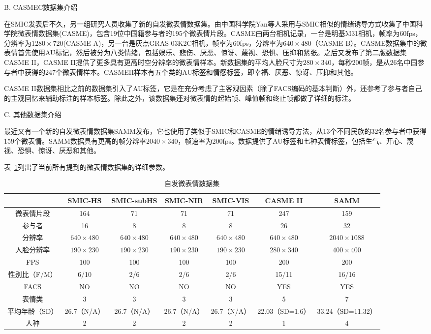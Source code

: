 B. CASMEC数据集介绍

在SMIC发表后不久，另一组研究人员收集了新的自发微表情数据集。由中国科学院Yan等人采用与SMIC相似的情绪诱导方式收集了中国科学院微表情数据集(CASME)，包含19位中国籍参与者的195个微表情片段。CASME由两台相机记录，一台是明基M31相机，帧率为60fps，分辨率为$1280\times720$(CASME-A)，另一台是灰点GRAS-03K2C相机，帧率为60fps，分辨率为$640\times480$（CASME-B）。CASME数据集中的微表情首先使用AU标记，然后被分为八类情绪，包括娱乐、悲伤、厌恶、惊讶、蔑视、恐惧、压抑和紧张。之后又发布了第二版数据集CASME II，CASME II提供了更多具有更高时空分辨率的微表情样本。新数据集的平均人脸尺寸为$280\times340$，每秒200帧，是从26名中国参与者中获得的247个微表情样本。CASMEII样本有五个类的AU标签和情感标签，即幸福、厌恶、惊讶、压抑和其他。

CASME II数据集相比之前的数据集引入了AU标签，它是在充分考虑了主客观因素（除了FACS编码的基本判断）外，还参考了参与者自己的主观回忆来辅助标注的样本标签。除此之外，该数据集还对微表情的起始帧、峰值帧和终止帧都做了详细的标注。

C. 其他数据集介绍

最近又有一个新的自发微表情数据集SAMM发布，它也使用了类似于SMIC和CASME的情绪诱导方法，从13个不同民族的32名参与者中获得159个微表情。SAMM数据具有更高的帧分辨率$2040\times340$，帧速率为200fps。数据提供了AU标签和七种表情标签，包括生气、开心、蔑视、恐惧、惊讶、厌恶和其他。

表~\ref{tab1}列出了当前所有提到的微表情数据集的详细参数。

\begin{table}[!htbp]
  \centering
  \caption{自发微表情数据集}
  \label{tab1}
  \footnotesize%
  \setlength{\tabcolsep}{4pt}%
  \renewcommand{\arraystretch}{1.2}%
  \begin{tabular}{c|cccccc}
    \hline
     & SMIC-HS & SMIC-subHS & SMIC-NIR & SMIC-VIS & CASME II & SAMM \\ \hline
    微表情片段 & 164 & 71 & 71 & 71 & 247 & 159 \\
    参与者 & 16 & 8 & 8 & 8 & 26 & 32 \\
    分辨率 & $640\times480$ & $640\times480$ & $640\times480$ & $640\times480$ & $640\times480$ & $2040\times1088$ \\
    人脸分辨率 & $190\times230$ & $190\times230$ & $190\times230$ & $190\times230$ & $280\times340$ & $400\times400$ \\
    FPS & 100 & 100 & 100 & 100 & 200 & 200 \\
    性别比（F/M） & 6/10 & 2/6 & 2/6 & 2/6 & 15/11 & 16/16 \\
    FACS & NO & NO & NO & NO & YES & YES \\
    表情类 & 3 & 3 & 3 & 3 & 5 & 7 \\
    平均年龄（SD） & 26.7（N/A） & 26.7（N/A） & 26.7（N/A） & 26.7（N/A） & 22.03（SD=1.6） & 33.24（SD=11.32） \\
    人种 & 2 & 2 & 2 & 2 & 1 & 4 \\ \hline
    \end{tabular}
\end{table}

